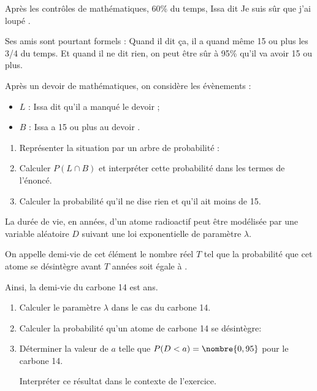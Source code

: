 \begin{question}[topic=probabilités]
  Après les contrôles de mathématiques, 60\% du temps, Issa dit \og Je
  suis sûr que j'ai loupé \fg.

  Ses amis sont pourtant formels : \og Quand il dit ça, il a quand même 15
  ou plus les 3/4 du temps.
  Et quand il ne dit rien, on peut être sûr à 95\% qu'il va avoir 15
  ou plus. \fg

  Après un devoir de mathématiques, on considère les évènements :
  \begin{itemize}
    \item $L$ : \og Issa dit qu'il a manqué le devoir \fg ;
    \item $B$ : \og Issa a 15 ou plus au devoir \fg.
  \end{itemize}
  \vspace{-1\baselineskip}
  \begin{enumerate}
    \item Représenter la situation par un arbre de probabilité :
    \item Calculer $P(L\cap B)$ et interpréter cette probabilité dans les
      termes de l'énoncé.
    \item Calculer la probabilité qu'il ne dise rien et qu'il ait moins de 15.
  \end{enumerate}
\end{question}

\begin{question}[topic=loi_continue]
  La durée de vie, en années, d'un atome radioactif peut être modélisée par
  une variable aléatoire $D$ suivant une loi exponentielle de paramètre
  $\lambda$.

  On appelle demi-vie de cet élément le nombre réel $T$ tel que la
  probabilité que cet atome se désintègre avant $T$ années soit égale à
  .

  Ainsi, la demi-vie du carbone 14 est  ans.
  \begin{enumerate}
    \item Calculer le paramètre $\lambda$ dans le cas du carbone 14.
    \item Calculer la probabilité qu'un atome de carbone 14 se désintègre:
    \item Déterminer la valeur de $a$ telle que $P(D<a)=\nombre{0,95}$ pour
      le carbone 14.

      Interpréter ce résultat dans le contexte de l'exercice.
  \end{enumerate}
\end{question}

